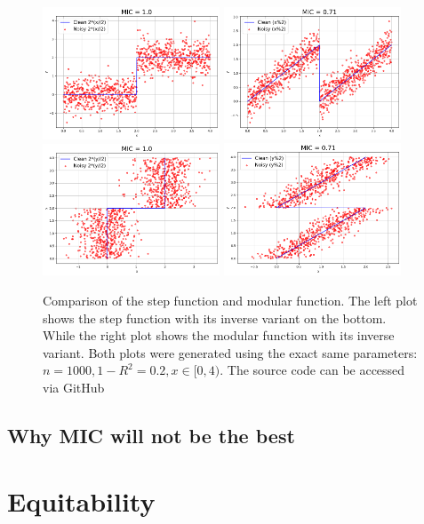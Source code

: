 \documentclass{article}
\begin{document}
\begin{figure}
    
    \centering
    \includegraphics[width=0.47\textwidth]{images/step1.png}
    \includegraphics[width=0.47\textwidth]{images/mod1.png}
    \includegraphics[width=0.47\textwidth]{images/step2.png}
    \includegraphics[width=0.47\textwidth]{images/mod2.png}
    \caption{Comparison of the step function and modular function. The left plot shows the step function with its inverse variant on the bottom. While the right plot shows the modular function with its inverse variant. Both plots were generated using the exact same parameters: $n = 1000, 1-R^2=0.2, x\in [0, 4)$. The source code can be accessed via GitHub \citep{src}}
    \label{fig:step_mod}
\end{figure}

\subsection{Why MIC will not be the best}

\section{Equitability}



	

\end{document}
